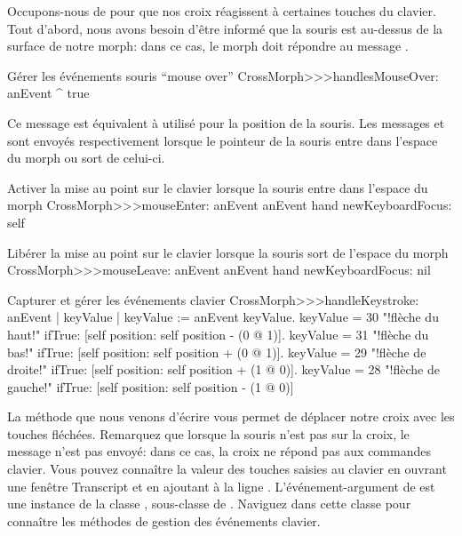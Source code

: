 \documentclass[a4paper,10pt,twoside]{book}
\begin{document}
Occupons-nous de  pour que nos croix réagissent à
certaines touches du clavier. Tout d'abord, nous avons besoin d'être
informé que la souris est au-dessus de la surface de notre morph:
dans ce cas, le morph doit répondre  au message
.


\begin{method}{Gérer les événements souris ``mouse over''} 
CrossMorph>>>handlesMouseOver: anEvent
	^ true
\end{method}

\noindent
Ce message est équivalent à 
utilisé pour la position de la souris.
Les messages  et
 sont envoyés respectivement lorsque le
pointeur de la souris entre dans l'espace du morph ou sort de celui-ci.

\begin{method}{Activer la mise au point sur le clavier lorsque la souris entre dans l'espace du morph}
CrossMorph>>>mouseEnter: anEvent
	anEvent hand newKeyboardFocus: self
\end{method}

\begin{method}{Libérer la mise au point sur le clavier lorsque la souris sort de l'espace du morph}
CrossMorph>>>mouseLeave: anEvent
	anEvent hand newKeyboardFocus: nil
\end{method}

\begin{method}[handleKeystroke]{Capturer et gérer les événements clavier}
CrossMorph>>>handleKeystroke: anEvent
	| keyValue |
	keyValue := anEvent keyValue.
	keyValue = 30	 "!flèche du haut!"
		ifTrue: [self position: self position - (0 @ 1)].
	keyValue = 31	 "!flèche du bas!"
		ifTrue: [self position: self position + (0 @ 1)].
	keyValue = 29	 "!flèche de droite!"
		ifTrue: [self position: self position + (1 @ 0)].
	keyValue = 28	 "!flèche de gauche!"
		ifTrue: [self position: self position - (1 @ 0)]
\end{method}

La méthode que nous venons d'écrire vous permet de déplacer
notre croix avec les touches fléchées. Remarquez que lorsque la
souris n'est pas sur la croix, le message
 n'est pas envoyé: dans ce cas, la croix
ne répond pas aux commandes clavier.
Vous pouvez connaître la valeur des touches saisies au clavier en
ouvrant une fenêtre Transcript et en ajoutant à 
 la ligne 
 .
L'événement-argument  de  est une
instance de la classe , sous-classe de
. Naviguez dans cette classe pour connaître les
méthodes de gestion des événements clavier.
\end{document}

